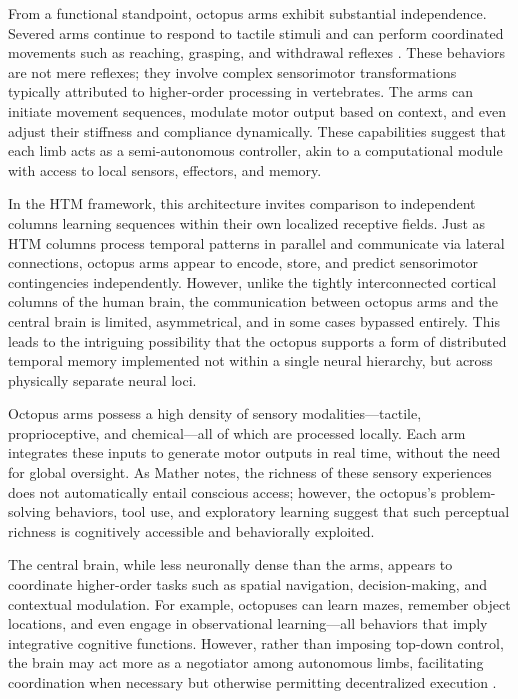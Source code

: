 \documentclass{article}
\begin{document}
From a functional standpoint, octopus arms exhibit substantial independence. Severed arms continue to respond to tactile stimuli and can perform coordinated movements such as reaching, grasping, and withdrawal reflexes \parencite{carls2022where}. These behaviors are not mere reflexes; they involve complex sensorimotor transformations typically attributed to higher-order processing in vertebrates. The arms can initiate movement sequences, modulate motor output based on context, and even adjust their stiffness and compliance dynamically. These capabilities suggest that each limb acts as a semi-autonomous controller, akin to a computational module with access to local sensors, effectors, and memory.

In the HTM framework, this architecture invites comparison to independent columns learning sequences within their own localized receptive fields. Just as HTM columns process temporal patterns in parallel and communicate via lateral connections, octopus arms appear to encode, store, and predict sensorimotor contingencies independently. However, unlike the tightly interconnected cortical columns of the human brain, the communication between octopus arms and the central brain is limited, asymmetrical, and in some cases bypassed entirely. This leads to the intriguing possibility that the octopus supports a form of distributed temporal memory implemented not within a single neural hierarchy, but across physically separate neural loci.

Octopus arms possess a high density of sensory modalities—tactile, proprioceptive, and chemical—all of which are processed locally. Each arm integrates these inputs to generate motor outputs in real time, without the need for global oversight. As Mather \parencite{mather2021octopus} notes, the richness of these sensory experiences does not automatically entail conscious access; however, the octopus's problem-solving behaviors, tool use, and exploratory learning suggest that such perceptual richness is cognitively accessible and behaviorally exploited.

The central brain, while less neuronally dense than the arms, appears to coordinate higher-order tasks such as spatial navigation, decision-making, and contextual modulation. For example, octopuses can learn mazes, remember object locations, and even engage in observational learning—all behaviors that imply integrative cognitive functions. However, rather than imposing top-down control, the brain may act more as a negotiator among autonomous limbs, facilitating coordination when necessary but otherwise permitting decentralized execution \parencite{carls2022where}.
\end{document}
